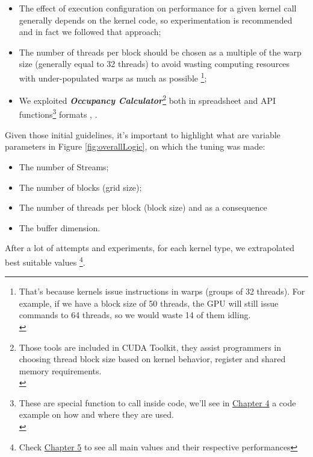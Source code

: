 	\begin{itemize}
		\item The effect of execution configuration on performance for a given kernel call generally
		depends on the kernel code, so experimentation is recommended and in fact we followed that approach;
		\item The number of threads per block should be chosen as a multiple of the warp size (generally equal to 32 threads) to avoid wasting computing resources with under-populated warps as much as possible \footnote{That's because kernels issue instructions in warps (groups of 32 threads). For example, if we have a block size of 50 threads, the GPU will still issue commands to 64 threads, so we would waste 14 of them idling.\\};
		\item We exploited \textbf{\textit{Occupancy Calculator}}\footnote{Those tools are included in CUDA Toolkit, they assist programmers in choosing thread block size based on kernel behavior, register and shared memory requirements.\\} both in spreadsheet and API functions\footnote{These are special function to call inside code, we'll see in \hyperref[chap:impl]{Chapter 4} a code example on how and where they are used.\\} formats , \cite{cudaguide}.
		 
	\end{itemize}

	Given those initial guidelines, it's important to highlight what are variable parameters in Figure \ref{fig:overallLogic}, on which the tuning was made:
	\begin{itemize}
		\item The number of Streams;		
		\item The number of blocks (grid size);
		\item The number of threads per block (block size) and as a consequence
		\item The buffer dimension.\\
	\end{itemize}
	After a lot of attempts and experiments, for each kernel type, we extrapolated best suitable values \footnote{Check \hyperref[chap:experim]{Chapter 5} to see all main values and their respective performances }.
 
			 
